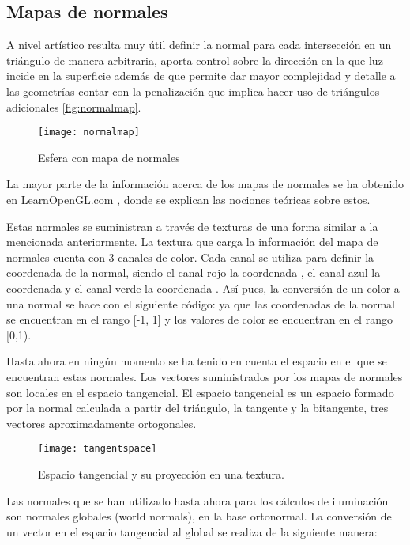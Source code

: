 \subsection{Mapas de normales}
		
A nivel artístico resulta muy útil definir la normal para cada intersección en un triángulo de manera arbitraria, aporta control sobre la dirección en la que luz incide en la superficie además de que permite dar mayor complejidad y detalle a las geometrías contar con la penalización que implica hacer uso de triángulos adicionales \autoref{fig:normalmap}. 
	
		
\begin{figure}[H]
    \centering
	\texttt{[image: normalmap]}
	\caption{Esfera con mapa de normales}
	\label{fig:normalmap}
\end{figure}

	
La mayor parte de la información acerca de los mapas de normales se ha obtenido en LearnOpenGL.com \cite{learnopengl}, donde se explican las nociones teóricas sobre estos.
	
Estas normales se suministran a través de texturas de una forma similar a la mencionada anteriormente. La textura que carga la información del mapa de normales cuenta con 3 canales de color. Cada canal se utiliza para definir la coordenada de la normal, siendo el canal rojo la coordenada , el canal azul la coordenada  y el canal verde la coordenada . Así pues, la conversión de un color a una normal se hace con el siguiente código:  ya que las coordenadas de la normal se encuentran en el rango [-1, 1] y los valores de color se encuentran en el rango [0,1).
	
Hasta ahora en ningún momento se ha tenido en cuenta el espacio en el que se encuentran estas normales. Los vectores suministrados por los mapas de normales son locales en el espacio tangencial. El espacio tangencial es un espacio formado por la normal calculada a partir del triángulo, la tangente y la bitangente, tres vectores aproximadamente ortogonales.

\begin{figure}[H]
    \centering
	\texttt{[image: tangentspace]}
	\caption{Espacio tangencial y su proyección en una textura.}
	\label{fig:tangentspace}
\end{figure}
	
Las normales que se han utilizado hasta ahora para los cálculos de iluminación son normales globales (world normals), en la base ortonormal. La conversión de un vector en el espacio tangencial al global se realiza de la siguiente manera: 
	
